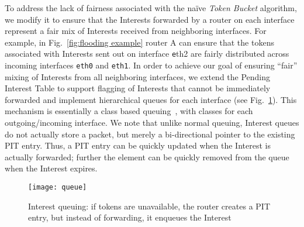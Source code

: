 To address the lack of fairness associated with the na\"ive {\it Token Bucket} algorithm, we modify it to ensure that the Interests forwarded by a router on each interface represent a fair mix of Interests received from neighboring interfaces. For example, in Fig.~\ref{fig:flooding example} router A can ensure that the tokens associated with Interests sent out on interface {\texttt eth2}  are fairly distributed across incoming interfaces \texttt{eth0} and \texttt{eth1}. 
In order to achieve our goal of ensuring ``fair'' mixing of Interests from all neighboring interfaces, 
we extend the Pending Interest Table to support flagging of Interests that cannot be immediately forwarded and implement hierarchical queues for each interface (see Fig.~\ref{fig:queueing}). 
This mechanism is essentially a class based queuing~\cite{floyd1995link}, with classes for each outgoing/incoming interface.
We note that unlike normal queuing, Interest queues do not actually store a packet, but merely a bi-directional pointer to the existing PIT entry.
Thus, a PIT entry can be quickly updated when the Interest is actually forwarded; further the element can be quickly removed from the queue when the Interest expires.


\begin{figure}[thb]
  \centering
  \texttt{[image: queue]}
  \vspace{-1cm}
  \caption{Interest queuing: if tokens are unavailable, the router creates a PIT entry, but instead of forwarding, it enqueues the Interest}
  \label{fig:queueing}
\end{figure}

